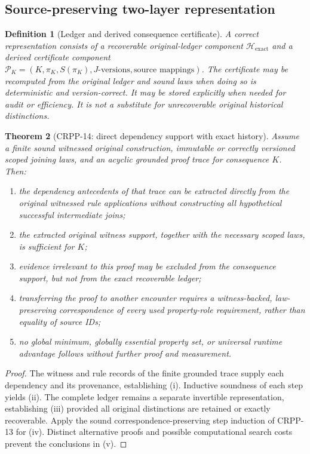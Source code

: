 \documentclass[11pt]{article}
\newtheorem{definition}{Definition}[section]
\newtheorem{theorem}[definition]{Theorem}
\begin{document}
\subsection{Source-preserving two-layer representation}
\begin{definition}[Ledger and derived consequence certificate]
A correct representation consists of a recoverable
original-ledger component $\mathcal H_{\mathrm{exact}}$
and a derived certificate component
$\mathcal P_K=(K,\pi_K,S(\pi_K),J\text{-versions},
\text{source mappings})$. The certificate may
be recomputed from the original ledger and sound
laws when doing so is deterministic and
version-correct. It may be stored explicitly
when needed for audit or efficiency. It is
not a substitute for unrecoverable original
historical distinctions.
\end{definition}

\begin{theorem}[CRPP-14: direct dependency support with exact history]
Assume a finite sound witnessed original construction,
immutable or correctly versioned scoped joining
laws, and an acyclic grounded proof trace for
consequence $K$. Then:
\begin{enumerate}[label=(\roman*)]
\item the dependency antecedents of that trace can
be extracted directly from the original witnessed
rule applications without constructing all
hypothetical successful intermediate joins;
\item the extracted original witness support,
together with the necessary scoped laws, is
sufficient for $K$;
\item evidence irrelevant to this proof may
be excluded from the consequence support,
but not from the exact recoverable ledger;
\item transferring the proof to another encounter
requires a witness-backed, law-preserving
correspondence of every used property-role
requirement, rather than equality of source IDs;
\item no global minimum, globally essential
property set, or universal runtime advantage
follows without further proof and measurement.
\end{enumerate}
\end{theorem}
\begin{proof}
The witness and rule records of the finite
grounded trace supply each dependency and
its provenance, establishing (i).
Inductive soundness of each step yields (ii).
The complete ledger remains a separate
invertible representation, establishing (iii)
provided all original distinctions are retained
or exactly recoverable. Apply the sound
correspondence-preserving step induction
of CRPP-13 for (iv). Distinct alternative
proofs and possible computational search
costs prevent the conclusions in (v).
\end{proof}
\end{document}
